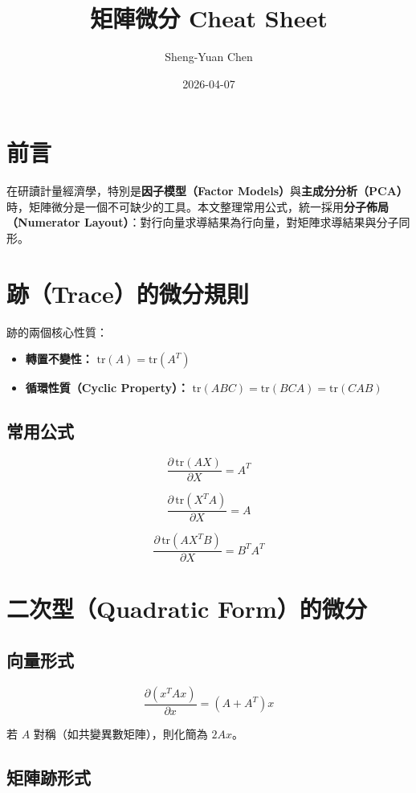 \documentclass[12pt, a4paper]{article}
\title{矩陣微分 Cheat Sheet}
\author{Sheng-Yuan Chen}
\date{2026-04-07}
\begin{document}
\maketitle

\section*{前言}

在研讀計量經濟學，特別是\textbf{因子模型（Factor Models）}與\textbf{主成分分析（PCA）}時，矩陣微分是一個不可缺少的工具。本文整理常用公式，統一採用\textbf{分子佈局（Numerator Layout）}：對行向量求導結果為行向量，對矩陣求導結果與分子同形。

\section{跡（Trace）的微分規則}

跡的兩個核心性質：
\begin{itemize}
  \item \textbf{轉置不變性：} $\text{tr}(A) = \text{tr}(A^T)$
  \item \textbf{循環性質（Cyclic Property）：} $\text{tr}(ABC) = \text{tr}(BCA) = \text{tr}(CAB)$
\end{itemize}

\subsection*{常用公式}

$$\frac{\partial \, \text{tr}(AX)}{\partial X} = A^T$$

$$\frac{\partial \, \text{tr}(X^T A)}{\partial X} = A$$

$$\frac{\partial \, \text{tr}(AX^T B)}{\partial X} = B^T A^T$$

\section{二次型（Quadratic Form）的微分}

\subsection*{向量形式}

$$\frac{\partial (x^T A x)}{\partial x} = (A + A^T)x$$

若 $A$ 對稱（如共變異數矩陣），則化簡為 $2Ax$。

\subsection*{矩陣跡形式}
\end{document}
